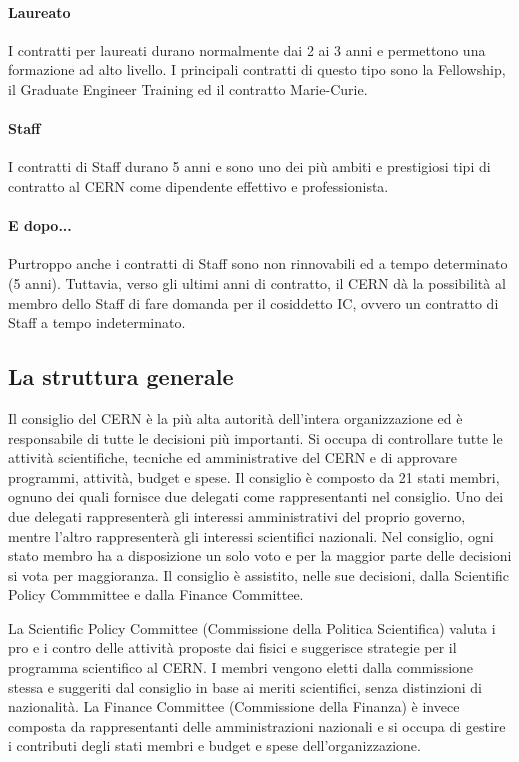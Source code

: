 			\paragraph{Laureato}I contratti per laureati durano normalmente dai 2 ai 3 anni e permettono una formazione ad alto livello. I principali contratti di questo tipo sono la Fellowship, il Graduate Engineer Training ed il contratto Marie-Curie.
			
			\paragraph{Staff}I contratti di Staff durano 5 anni e sono uno dei più ambiti e prestigiosi tipi di contratto al \ac{CERN} come dipendente effettivo e professionista.
			
			\paragraph{E dopo...}Purtroppo anche i contratti di Staff sono non rinnovabili ed a tempo determinato (5 anni). Tuttavia, verso gli ultimi anni di contratto, il \ac{CERN} dà la possibilità al membro dello Staff di fare domanda per il cosiddetto \ac{IC}, ovvero un contratto di Staff a tempo indeterminato.
	
		\subsection{La struttura generale} \label{subsec:C;l;struttura}
		
			Il consiglio del \ac{CERN} è la più alta autorità dell'intera organizzazione ed è responsabile di tutte le decisioni più importanti. Si occupa di controllare tutte le attività scientifiche, tecniche ed amministrative del \ac{CERN} e di approvare programmi, attività, budget e spese. Il consiglio è composto da 21 stati membri, ognuno dei quali fornisce due delegati come rappresentanti nel consiglio. Uno dei due delegati rappresenterà gli interessi amministrativi del proprio governo, mentre l'altro rappresenterà gli interessi scientifici nazionali. Nel consiglio, ogni stato membro ha a disposizione un solo voto e per la maggior parte delle decisioni si vota per maggioranza. Il consiglio è assistito, nelle sue decisioni, dalla Scientific Policy Commmittee e dalla Finance Committee.
			
			La Scientific Policy Committee (Commissione della Politica Scientifica) valuta i pro e i contro delle attività proposte dai fisici e suggerisce strategie per il programma scientifico al \ac{CERN}. I membri vengono eletti dalla commissione stessa e suggeriti dal consiglio in base ai meriti scientifici, senza distinzioni di nazionalità. La Finance Committee (Commissione della Finanza) è invece composta da rappresentanti delle amministrazioni nazionali e si occupa di gestire i contributi degli stati membri e budget e spese dell'organizzazione.
			
